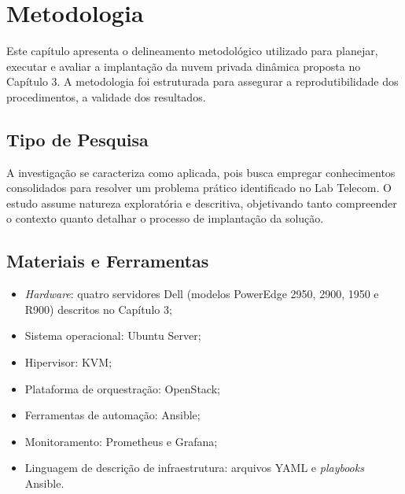 
\chapter{Metodologia}
\setcounter{table}{0}

Este capítulo apresenta o delineamento metodológico utilizado para planejar, executar e avaliar a implantação da nuvem privada dinâmica proposta no Capítulo 3. A metodologia foi estruturada para assegurar a reprodutibilidade dos procedimentos, a validade dos resultados.

\section{Tipo de Pesquisa}
A investigação se caracteriza como aplicada, pois busca empregar conhecimentos consolidados para resolver um problema prático identificado no Lab Telecom. O estudo assume natureza exploratória e descritiva, objetivando tanto compreender o contexto quanto detalhar o processo de implantação da solução.

\section{Materiais e Ferramentas}
\begin{itemize}
    \item \textit{Hardware}: quatro servidores Dell (modelos PowerEdge 2950, 2900, 1950 e R900) descritos no Capítulo 3;
    \item Sistema operacional: Ubuntu Server;
    \item Hipervisor: KVM;
    \item Plataforma de orquestração: OpenStack;
    \item Ferramentas de automação: Ansible;
    \item Monitoramento: Prometheus e Grafana;
    \item Linguagem de descrição de infraestrutura: arquivos YAML e \textit{playbooks} Ansible.
\end{itemize}


